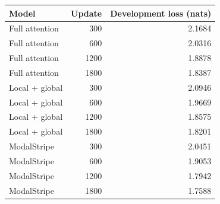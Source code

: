 \begin{tabular}{lrr}\toprule
Model & Update & Development loss (nats)\\\midrule
Full attention & 300 & 2.1684 \\
Full attention & 600 & 2.0316 \\
Full attention & 1200 & 1.8878 \\
Full attention & 1800 & 1.8387 \\
Local + global & 300 & 2.0946 \\
Local + global & 600 & 1.9669 \\
Local + global & 1200 & 1.8575 \\
Local + global & 1800 & 1.8201 \\
ModalStripe & 300 & 2.0451 \\
ModalStripe & 600 & 1.9053 \\
ModalStripe & 1200 & 1.7942 \\
ModalStripe & 1800 & 1.7588 \\
\bottomrule\end{tabular}
